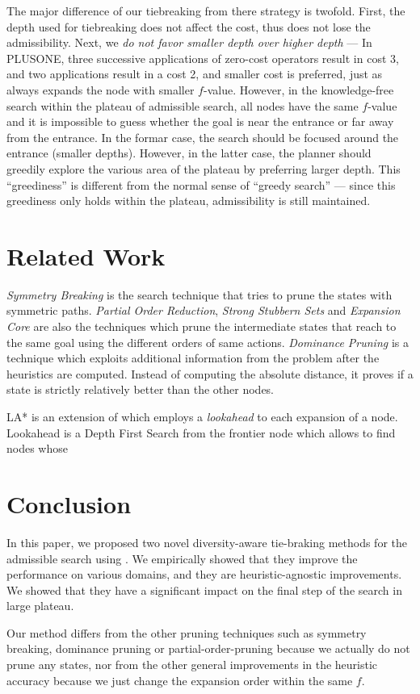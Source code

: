 The major difference of our tiebreaking from there strategy is twofold. First, the
depth used for tiebreaking does not affect the cost, thus does not lose
the admissibility. Next, we \emph{do not favor smaller depth over
higher depth} --- In PLUSONE, three successive applications of zero-cost operators result in
cost 3, and two applications result in a cost 2, and smaller cost is
preferred, just as \astar always expands the node with smaller $f$-value.
However, in the knowledge-free search within the plateau of admissible search,
all nodes have the same $f$-value
and it is impossible to guess whether the goal is near the entrance or
far away from the entrance.
In the formar case, the search should be focused around the entrance
(smaller depths). However, in the latter case, the planner should
greedily explore the various area of the plateau by preferring larger depth.
This ``greediness'' is different from the normal sense of ``greedy
search'' --- since this greediness only holds within the plateau,
admissibility is still maintained.



\section{Related Work}
\label{sec-4}

\emph{Symmetry Breaking} \cite{Fox1998,pochter2011exploiting,domshlak2013symmetry} is the search technique that tries to prune the states with symmetric paths. \emph{Partial Order Reduction}, \emph{Strong Stubbern Sets} and \emph{Expansion Core} are also the techniques which prune the intermediate states that reach to the same goal using the different orders of same actions. \emph{Dominance Pruning} \cite{erol1994} is a technique which exploits additional information from the problem after the heuristics are computed. Instead of computing the absolute distance, it  proves if a state is strictly relatively better than the other nodes.

LA* is an extension of \astar which employs a \emph{lookahead} to each
expansion of a node. Lookahead is a Depth First Search from the frontier
node which allows to find nodes whose 

\section{Conclusion}

In this paper, we proposed two novel diversity-aware tie-braking methods for the admissible search using \astar. We empirically showed that they improve the performance on various domains, and they are heuristic-agnostic improvements. We showed that they have a significant impact on the final step of the search in large plateau.

Our method differs from the other pruning techniques such as symmetry breaking, dominance pruning or partial-order-pruning because we actually do not prune any states, nor from the other general improvements in the heuristic accuracy because we just change the expansion order within the same $f$.
